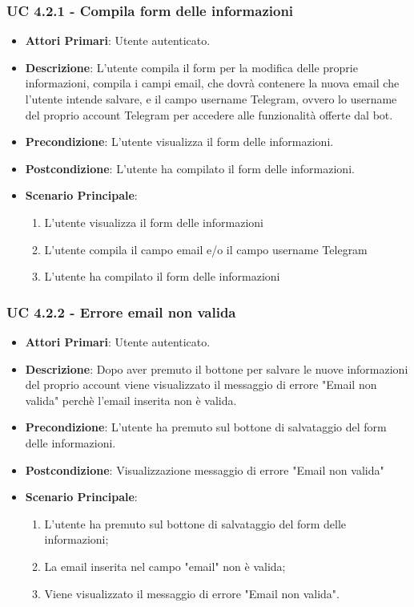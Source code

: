 			\subsubsection{UC 4.2.1 - Compila form delle informazioni}
			\begin{itemize}
				\item \textbf{Attori Primari}: Utente autenticato.
				\item \textbf{Descrizione}: L'utente compila il form per la modifica delle proprie informazioni, compila i campi email, che dovrà contenere la nuova email che l'utente intende salvare, e il campo username Telegram, ovvero lo username del proprio account Telegram per accedere alle funzionalità offerte dal bot.
				\item \textbf{Precondizione}: L'utente visualizza il form delle informazioni.
				\item \textbf{Postcondizione}: L'utente ha compilato il form delle informazioni.
				\item \textbf{Scenario Principale}:
				\begin{enumerate}
					\item{L'utente visualizza il form delle informazioni}
					\item{L'utente compila il campo email e/o il campo username Telegram}
					\item{L'utente ha compilato il form delle informazioni}
				\end{enumerate}
			\end{itemize}

			\subsubsection{UC 4.2.2 - Errore email non valida}
			\begin{itemize}
				\item \textbf{Attori Primari}: Utente autenticato.
				\item \textbf{Descrizione}: Dopo aver premuto il bottone per salvare le nuove informazioni del proprio account viene visualizzato il messaggio di errore "Email non valida" perchè l'email inserita non è valida. 
				\item \textbf{Precondizione}: L'utente ha premuto sul bottone di salvataggio del form delle informazioni.
				\item \textbf{Postcondizione}: Visualizzazione messaggio di errore "Email non valida"
				\item \textbf{Scenario Principale}:
				\begin{enumerate}
					\item{L'utente ha premuto sul bottone di salvataggio del form delle informazioni;}
					\item{La email inserita nel campo "email" non è valida;}
					\item{Viene visualizzato il messaggio di errore "Email non valida".}
				\end{enumerate}	
			\end{itemize}

